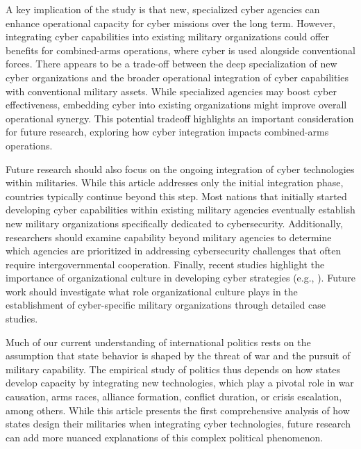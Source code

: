 \documentclass[12pt, letterpaper]{article}
\theoremstyle{plain}
\theoremstyle{remark}
\begin{document}
A key implication of the study is that new, specialized cyber agencies can enhance operational capacity for cyber missions over the long term. However, integrating cyber capabilities into existing military organizations could offer benefits for combined-arms operations, where cyber is used alongside conventional forces. There appears to be a trade-off between the deep specialization of new cyber organizations and the broader operational integration of cyber capabilities with conventional military assets. While specialized agencies may boost cyber effectiveness, embedding cyber into existing organizations might improve overall operational synergy. This potential tradeoff highlights an important consideration for future research, exploring how cyber integration impacts combined-arms operations.


Future research should also focus on the ongoing integration of cyber technologies within militaries. 
While this article addresses only the initial integration phase, countries typically continue beyond this step. Most nations that initially started developing cyber capabilities within existing military agencies eventually establish new military organizations specifically dedicated to cybersecurity. Additionally, researchers should examine capability beyond military agencies to determine which agencies are prioritized in addressing cybersecurity challenges that often require intergovernmental cooperation. Finally, recent studies highlight the importance of organizational culture in developing cyber strategies (e.g., \citet{Kostyuk2022sources, Schneider2024digital, Lonergan2024emerging}). Future work should investigate what role organizational culture plays in the establishment of cyber-specific military organizations through detailed case studies.


Much of our current understanding of international politics rests on the assumption that state behavior is shaped by the threat of war and the pursuit of military capability. 
The empirical study of politics thus depends on how states develop capacity by integrating new technologies,  which play a pivotal role in war causation, arms races, alliance formation, conflict duration, or crisis escalation, among others.
While this article presents the first comprehensive analysis of how states design their militaries when integrating cyber technologies, future research can add more nuanced explanations of this complex political phenomenon. 
\end{document}
